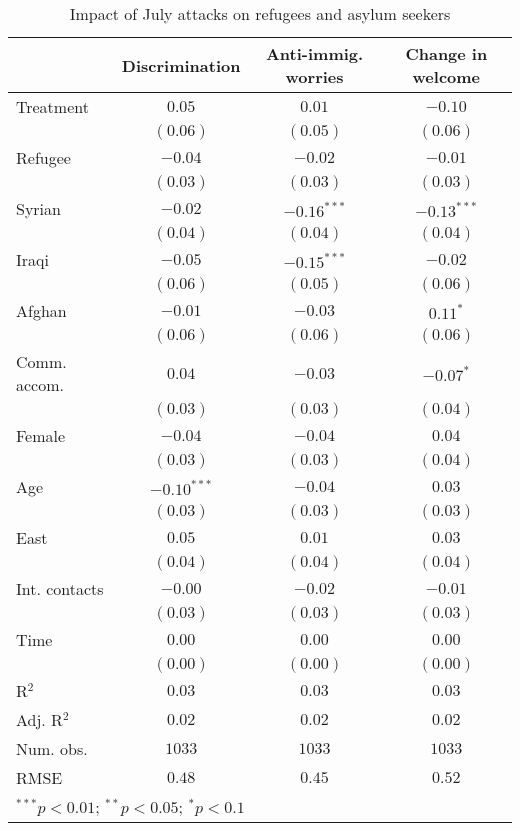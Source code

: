 
\begin{table}
\caption{Impact of July attacks on refugees and asylum seekers}
\begin{center}
\begin{tabular}{l c c c}
\toprule
 & Discrimination & Anti-immig. worries & Change in welcome \\
\midrule
Treatment     & $0.05$        & $0.01$        & $-0.10$       \\
              & $(0.06)$      & $(0.05)$      & $(0.06)$      \\
Refugee       & $-0.04$       & $-0.02$       & $-0.01$       \\
              & $(0.03)$      & $(0.03)$      & $(0.03)$      \\
Syrian        & $-0.02$       & $-0.16^{***}$ & $-0.13^{***}$ \\
              & $(0.04)$      & $(0.04)$      & $(0.04)$      \\
Iraqi         & $-0.05$       & $-0.15^{***}$ & $-0.02$       \\
              & $(0.06)$      & $(0.05)$      & $(0.06)$      \\
Afghan        & $-0.01$       & $-0.03$       & $0.11^{*}$    \\
              & $(0.06)$      & $(0.06)$      & $(0.06)$      \\
Comm. accom.  & $0.04$        & $-0.03$       & $-0.07^{*}$   \\
              & $(0.03)$      & $(0.03)$      & $(0.04)$      \\
Female        & $-0.04$       & $-0.04$       & $0.04$        \\
              & $(0.03)$      & $(0.03)$      & $(0.04)$      \\
Age           & $-0.10^{***}$ & $-0.04$       & $0.03$        \\
              & $(0.03)$      & $(0.03)$      & $(0.03)$      \\
East          & $0.05$        & $0.01$        & $0.03$        \\
              & $(0.04)$      & $(0.04)$      & $(0.04)$      \\
Int. contacts & $-0.00$       & $-0.02$       & $-0.01$       \\
              & $(0.03)$      & $(0.03)$      & $(0.03)$      \\
Time          & $0.00$        & $0.00$        & $0.00$        \\
              & $(0.00)$      & $(0.00)$      & $(0.00)$      \\
\midrule
R$^2$         & $0.03$        & $0.03$        & $0.03$        \\
Adj. R$^2$    & $0.02$        & $0.02$        & $0.02$        \\
Num. obs.     & $1033$        & $1033$        & $1033$        \\
RMSE          & $0.48$        & $0.45$        & $0.52$        \\
\bottomrule
\multicolumn{4}{l}{\scriptsize{$^{***}p<0.01$; $^{**}p<0.05$; $^{*}p<0.1$}}
\end{tabular}
\label{tab_host}
\end{center}
\end{table}
